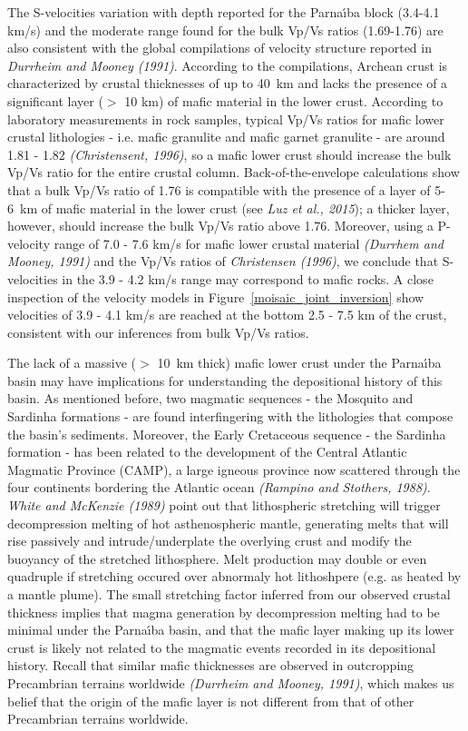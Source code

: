 \documentclass[manuscript,11pt]{geophysics}
\begin{document}
The S-velocities variation with depth reported for the Parna\'{\i}ba block (3.4-4.1 km/s) and the moderate range found for the bulk Vp/Vs ratios (1.69-1.76) are also consistent with the global compilations of velocity structure reported in \textit{Durrheim and Mooney (1991)}. According to the compilations, Archean crust is characterized by crustal thicknesses of up to 40~km and lacks the presence of a significant layer ($>$ 10 km) of mafic material in the lower crust. According to laboratory measurements in rock samples, typical Vp/Vs ratios for mafic lower crustal lithologies - i.e. mafic granulite and mafic garnet granulite - are around 1.81 - 1.82 \textit{(Christensent, 1996)}, so a mafic lower crust should increase the bulk Vp/Vs ratio for the entire crustal column. Back-of-the-envelope calculations show that a bulk Vp/Vs ratio of 1.76 is compatible with the presence of a layer of 5-6~km of mafic material in the lower crust (see \textit{Luz et al., 2015}); a thicker layer, however, should increase the bulk Vp/Vs ratio above 1.76. Moreover, using a P-velocity range of 7.0 - 7.6 km/s for mafic lower crustal material \textit{(Durrhem and Mooney, 1991)} and the Vp/Vs ratios of \textit{Christensen (1996)}, we conclude that S-velocities in the 3.9 - 4.2 km/s range may correspond to mafic rocks. A close inspection of the velocity models in Figure~\ref{moisaic_joint_inversion} show velocities of 3.9 - 4.1 km/s are reached at the bottom 2.5 - 7.5 km of the crust, consistent with our inferences from bulk Vp/Vs ratios. 

The lack of a massive ($>$ 10~km thick) mafic lower crust under the Parna\'{\i}ba basin may have implications for understanding the depositional history of this basin. As mentioned before, two magmatic sequences - the Mosquito and Sardinha formations - are found interfingering with the lithologies that compose the basin's sediments. Moreover, the Early Cretaceous sequence - the Sardinha formation - has been related to the development of the Central Atlantic Magmatic Province (CAMP), a large igneous province now scattered through the four continents bordering the Atlantic ocean \textit{(Rampino and Stothers, 1988)}.  \textit{White and McKenzie (1989)} point out that lithospheric stretching will trigger decompression melting of hot asthenospheric mantle, generating melts that will rise passively and intrude/underplate the overlying crust and modify the buoyancy of the stretched lithosphere. Melt production may double or even quadruple if stretching occured over abnormaly hot lithoshpere (e.g. as heated by a mantle plume). The small stretching factor inferred from our observed crustal thickness implies that magma generation by decompression melting had to be minimal under the Parna\'{\i}ba basin, and that the mafic layer making up its lower crust is likely not related to the magmatic events recorded in its depositional history. Recall that similar mafic thicknesses are observed in outcropping Precambrian terrains worldwide \textit{(Durrheim and Mooney, 1991)}, which makes us belief that the origin of the mafic layer is not different from that of other Precambrian terrains worldwide.
\end{document}
